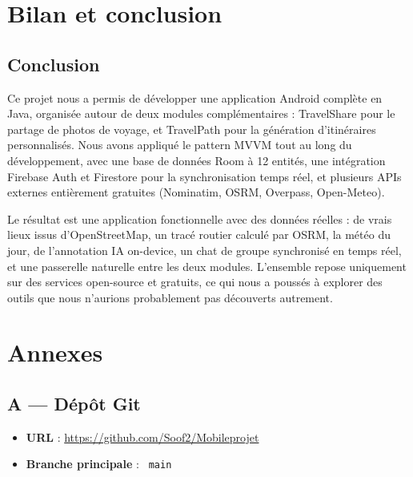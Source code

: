 \documentclass[a4paper,12pt,openany]{report}
\newcommand{\ic}[1]{\texttt{\small\colorbox{lightbg}{\color{navy!90} #1}}}
\begin{document}
\chapter{Bilan et conclusion}

\section{Conclusion}

Ce projet nous a permis de développer une application Android complète en Java,
organisée autour de deux modules complémentaires : TravelShare pour le partage de
photos de voyage, et TravelPath pour la génération d'itinéraires personnalisés.
Nous avons appliqué le pattern MVVM tout au long du développement, avec une base
de données Room à 12 entités, une intégration Firebase Auth et Firestore pour la
synchronisation temps réel, et plusieurs APIs externes entièrement gratuites
(Nominatim, OSRM, Overpass, Open-Meteo).

Le résultat est une application fonctionnelle avec des données réelles : de vrais
lieux issus d'OpenStreetMap, un tracé routier calculé par OSRM, la météo du jour,
de l'annotation IA on-device, un chat de groupe synchronisé en temps réel, et une
passerelle naturelle entre les deux modules. L'ensemble repose uniquement sur des
services open-source et gratuits, ce qui nous a poussés à explorer des outils que
nous n'aurions probablement pas découverts autrement.


\chapter*{Annexes}

\section*{A — Dépôt Git}

\begin{itemize}
  \item \textbf{URL} : \url{https://github.com/Soof2/Mobileprojet}
  \item \textbf{Branche principale} : \ic{main}
\end{itemize}
\end{document}

